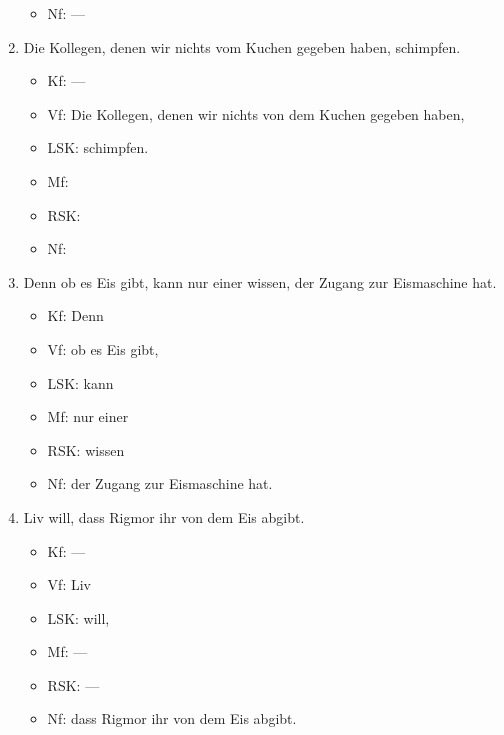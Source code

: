 \begin{enumerate}
\begin{itemize}
      \item Nf: ---
    \end{itemize}
  \item Die Kollegen, denen wir nichts vom Kuchen gegeben haben, schimpfen.
    \begin{itemize}
      \item Kf: ---
      \item Vf: Die Kollegen, denen wir nichts von dem Kuchen gegeben haben,
      \item LSK: schimpfen.
      \item Mf: 
      \item RSK: 
      \item Nf: 
    \end{itemize}


  \item Denn ob es Eis gibt, kann nur einer wissen, der Zugang zur Eismaschine hat.
    \begin{itemize}
      \item Kf: Denn
      \item Vf: ob es Eis gibt,
      \item LSK: kann
      \item Mf: nur einer
      \item RSK: wissen
      \item Nf: der Zugang zur Eismaschine hat.
    \end{itemize}
  \item Liv will, dass Rigmor ihr von dem Eis abgibt.
    \begin{itemize}
      \item Kf: ---
      \item Vf: Liv
      \item LSK: will,
      \item Mf: ---
      \item RSK: ---
      \item Nf: dass Rigmor ihr von dem Eis abgibt.
    \end{itemize}
\end{enumerate}

\label{sol:saetze03}

